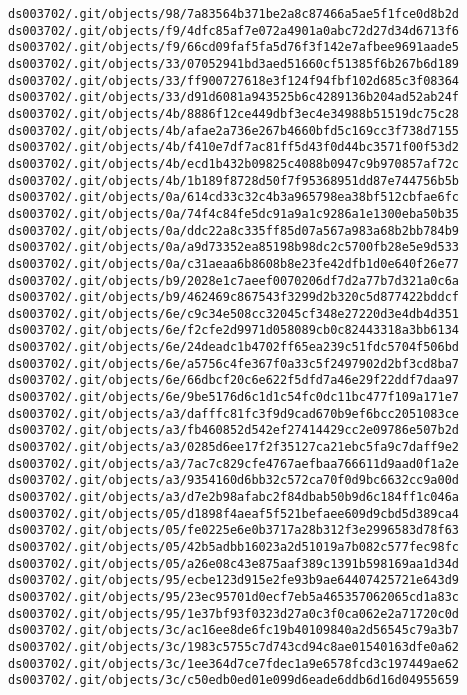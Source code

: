 \documentclass[11pt]{article}
\begin{document}
\begin{Verbatim}[commandchars=\\\{\}]
ds003702/.git/objects/98/7a83564b371be2a8c87466a5ae5f1fce0d8b2d
ds003702/.git/objects/f9/4dfc85af7e072a4901a0abc72d27d34d6713f6
ds003702/.git/objects/f9/66cd09faf5fa5d76f3f142e7afbee9691aade5
ds003702/.git/objects/33/07052941bd3aed51660cf51385f6b267b6d189
ds003702/.git/objects/33/ff900727618e3f124f94fbf102d685c3f08364
ds003702/.git/objects/33/d91d6081a943525b6c4289136b204ad52ab24f
ds003702/.git/objects/4b/8886f12ce449dbf3ec4e34988b51519dc75c28
ds003702/.git/objects/4b/afae2a736e267b4660bfd5c169cc3f738d7155
ds003702/.git/objects/4b/f410e7df7ac81ff5d43f0d44bc3571f00f53d2
ds003702/.git/objects/4b/ecd1b432b09825c4088b0947c9b970857af72c
ds003702/.git/objects/4b/1b189f8728d50f7f95368951dd87e744756b5b
ds003702/.git/objects/0a/614cd33c32c4b3a965798ea38bf512cbfae6fc
ds003702/.git/objects/0a/74f4c84fe5dc91a9a1c9286a1e1300eba50b35
ds003702/.git/objects/0a/ddc22a8c335ff85d07a567a983a68b2bb784b9
ds003702/.git/objects/0a/a9d73352ea85198b98dc2c5700fb28e5e9d533
ds003702/.git/objects/0a/c31aeaa6b8608b8e23fe42dfb1d0e640f26e77
ds003702/.git/objects/b9/2028e1c7aeef0070206df7d2a77b7d321a0c6a
ds003702/.git/objects/b9/462469c867543f3299d2b320c5d877422bddcf
ds003702/.git/objects/6e/c9c34e508cc32045cf348e27220d3e4db4d351
ds003702/.git/objects/6e/f2cfe2d9971d058089cb0c82443318a3bb6134
ds003702/.git/objects/6e/24deadc1b4702ff65ea239c51fdc5704f506bd
ds003702/.git/objects/6e/a5756c4fe367f0a33c5f2497902d2bf3cd8ba7
ds003702/.git/objects/6e/66dbcf20c6e622f5dfd7a46e29f22ddf7daa97
ds003702/.git/objects/6e/9be5176d6c1d1c54fc0dc11bc477f109a171e7
ds003702/.git/objects/a3/dafffc81fc3f9d9cad670b9ef6bcc2051083ce
ds003702/.git/objects/a3/fb460852d542ef27414429cc2e09786e507b2d
ds003702/.git/objects/a3/0285d6ee17f2f35127ca21ebc5fa9c7daff9e2
ds003702/.git/objects/a3/7ac7c829cfe4767aefbaa766611d9aad0f1a2e
ds003702/.git/objects/a3/9354160d6bb32c572ca70f0d9bc6632cc9a00d
ds003702/.git/objects/a3/d7e2b98afabc2f84dbab50b9d6c184ff1c046a
ds003702/.git/objects/05/d1898f4aeaf5f521befaee609d9cbd5d389ca4
ds003702/.git/objects/05/fe0225e6e0b3717a28b312f3e2996583d78f63
ds003702/.git/objects/05/42b5adbb16023a2d51019a7b082c577fec98fc
ds003702/.git/objects/05/a26e08c43e875aaf389c1391b598169aa1d34d
ds003702/.git/objects/95/ecbe123d915e2fe93b9ae64407425721e643d9
ds003702/.git/objects/95/23ec95701d0ecf7eb5a465357062065cd1a83c
ds003702/.git/objects/95/1e37bf93f0323d27a0c3f0ca062e2a71720c0d
ds003702/.git/objects/3c/ac16ee8de6fc19b40109840a2d56545c79a3b7
ds003702/.git/objects/3c/1983c5755c7d743cd94c8ae01540163dfe0a62
ds003702/.git/objects/3c/1ee364d7ce7fdec1a9e6578fcd3c197449ae62
ds003702/.git/objects/3c/c50edb0ed01e099d6eade6ddb6d16d04955659

\end{Verbatim}
\end{document}
